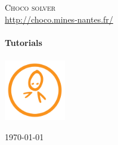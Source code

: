 \begin{titlepage}
\begin{center}
\textsc{\LARGE Choco solver}\\
\url{http://choco.mines-nantes.fr/}\\[1.5cm]

\HRule \\[0.4cm]
{ \Huge \bfseries Tutorials}\\
\HRule \\[1cm]
\includegraphics[width=0.20\textwidth]{../shared/media/logo.pdf} 

\vfill
{\large \today}
\end{center}
\end{titlepage}

\clearpage
